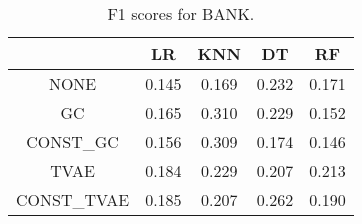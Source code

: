 \begin{table}
\caption{F1 scores for BANK.}
\label{tab:f1-BANK}
\begin{tabular}{ccccc}
\toprule
 & LR & KNN & DT & RF \\
\midrule
NONE & 0.145 & 0.169 & 0.232 & 0.171 \\
GC & 0.165 & 0.310 & 0.229 & 0.152 \\
CONST\_GC & 0.156 & 0.309 & 0.174 & 0.146 \\
TVAE & 0.184 & 0.229 & 0.207 & 0.213 \\
CONST\_TVAE & 0.185 & 0.207 & 0.262 & 0.190 \\
\bottomrule
\end{tabular}
\end{table}
